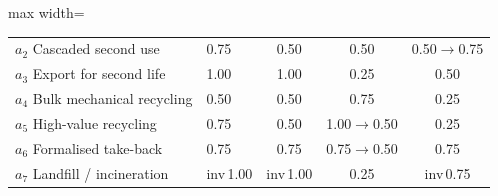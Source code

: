 \begin{table}[pos=t]
\begin{adjustbox}{max width=\linewidth}
\begin{tabular}{@{}p{3.1cm}p{8.6cm}ccc@{}}
$a_2$ Cascaded second use & 0.75 & 0.50 & 0.50 & 0.50$\to$0.75 \\
$a_3$ Export for second life & 1.00 & 1.00 & 0.25 & 0.50 \\
$a_4$ Bulk mechanical recycling & 0.50 & 0.50 & 0.75 & 0.25 \\
$a_5$ High-value recycling & 0.75 & 0.50 & 1.00$\to$0.50 & 0.25 \\
$a_6$ Formalised take-back & 0.75 & 0.75 & 0.75$\to$0.50 & 0.75 \\
$a_7$ Landfill / incineration & inv\,1.00 & inv\,1.00 & 0.25 & inv\,0.75 \\
\bottomrule\end{tabular}\end{adjustbox}\end{table}
